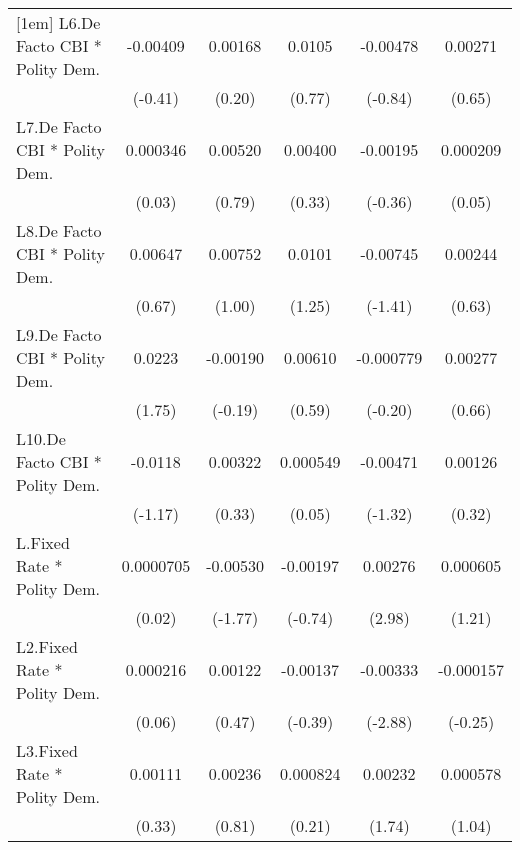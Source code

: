 {\begin{longtable}{l*{5}{c}}
[1em]
L6.De Facto CBI * Polity Dem.& -0.00409         &  0.00168         &   0.0105         & -0.00478         &  0.00271         \\
                &  (-0.41)         &   (0.20)         &   (0.77)         &  (-0.84)         &   (0.65)         \\
[1em]
L7.De Facto CBI * Polity Dem.& 0.000346         &  0.00520         &  0.00400         & -0.00195         & 0.000209         \\
                &   (0.03)         &   (0.79)         &   (0.33)         &  (-0.36)         &   (0.05)         \\
[1em]
L8.De Facto CBI * Polity Dem.&  0.00647         &  0.00752         &   0.0101         & -0.00745         &  0.00244         \\
                &   (0.67)         &   (1.00)         &   (1.25)         &  (-1.41)         &   (0.63)         \\
[1em]
L9.De Facto CBI * Polity Dem.&   0.0223         & -0.00190         &  0.00610         &-0.000779         &  0.00277         \\
                &   (1.75)         &  (-0.19)         &   (0.59)         &  (-0.20)         &   (0.66)         \\
[1em]
L10.De Facto CBI * Polity Dem.&  -0.0118         &  0.00322         & 0.000549         & -0.00471         &  0.00126         \\
                &  (-1.17)         &   (0.33)         &   (0.05)         &  (-1.32)         &   (0.32)         \\
[1em]
L.Fixed Rate * Polity Dem.&0.0000705         & -0.00530         & -0.00197         &  0.00276\sym{**} & 0.000605         \\
                &   (0.02)         &  (-1.77)         &  (-0.74)         &   (2.98)         &   (1.21)         \\
[1em]
L2.Fixed Rate * Polity Dem.& 0.000216         &  0.00122         & -0.00137         & -0.00333\sym{**} &-0.000157         \\
                &   (0.06)         &   (0.47)         &  (-0.39)         &  (-2.88)         &  (-0.25)         \\
[1em]
L3.Fixed Rate * Polity Dem.&  0.00111         &  0.00236         & 0.000824         &  0.00232         & 0.000578         \\
                &   (0.33)         &   (0.81)         &   (0.21)         &   (1.74)         &   (1.04)         \\

\end{longtable}}
